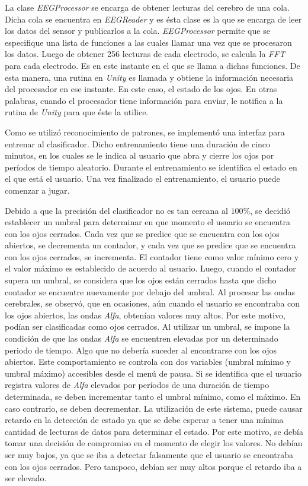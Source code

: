 La clase \emph{EEGProcessor} se encarga de obtener lecturas del cerebro de una cola. Dicha cola se encuentra en \emph{EEGReader} y es ésta clase es la que se encarga de leer los datos del sensor y publicarlos a la cola. \emph{EEGProcessor} permite que se especifique una lista de funciones a las cuales llamar una vez que se procesaron los datos. Luego de obtener 256 lecturas de cada electrodo, se calcula la \emph{FFT} para cada electrodo. Es en este instante en el que se llama a dichas funciones. De esta manera, una rutina en \emph{Unity} es llamada y obtiene la información necesaria del procesador en ese instante. En este caso, el estado de los ojos. En otras palabras, cuando el procesador tiene información para enviar, le notifica a la rutina de \emph{Unity} para que éste la utilice.

Como se utilizó reconocimiento de patrones, se implementó una interfaz para entrenar al clasificador. Dicho entrenamiento tiene una duración de cinco minutos, en los cuales se le indica al usuario que abra y cierre los ojos por períodos de tiempo aleatorio. Durante el entrenamiento se identifica el estado en el que está el usuario. Una vez finalizado el entrenamiento, el usuario puede comenzar a jugar.

Debido a que la precisión del clasificador no es tan cercana al $100\%$, se decidió establecer un umbral para determinar en que momento el usuario se encuentra con los ojos cerrados. Cada vez que se predice que se encuentra con los ojos abiertos, se decrementa un contador, y cada vez que se predice que se encuentra con los ojos cerrados, se incrementa. El contador tiene como valor mínimo cero y el valor máximo es establecido de acuerdo al usuario.  Luego, cuando el contador supera un umbral, se considera que los ojos están cerrados hasta que dicho contador se encuentre nuevamente por debajo del umbral. Al procesar las ondas cerebrales, se observó, que en ocasiones, aún cuando el usuario se encontraba con los ojos abiertos, las ondas \emph{Alfa}, obtenían valores muy altos. Por este motivo, podían ser clasificadas como ojos cerrados. Al utilizar un umbral, se impone la condición de que las ondas  \emph{Alfa} se encuentren elevadas por un determinado periodo de tiempo. Algo que no debería suceder al encontrarse con los ojos abiertos. Este comportamiento se controla con dos variables (umbral mínimo y umbral máximo) accesibles desde el menú de pausa. Si se identifica que el usuario registra valores de \emph{Alfa} elevados por períodos de una duración de tiempo determinada, se deben incrementar  tanto el umbral mínimo, como el máximo. En caso contrario, se deben decrementar. La utilización de este sistema, puede causar retardo en la detección de estado ya que se debe esperar a tener una mínima cantidad de lecturas de datos para determinar el estado. Por este motivo, se debía tomar una decisión de compromiso en el momento de elegir los valores. No debían ser muy bajos, ya que se iba a detectar falsamente que el usuario se encontraba con los ojos cerrados. Pero tampoco, debían ser muy altos porque el retardo iba a ser elevado.

